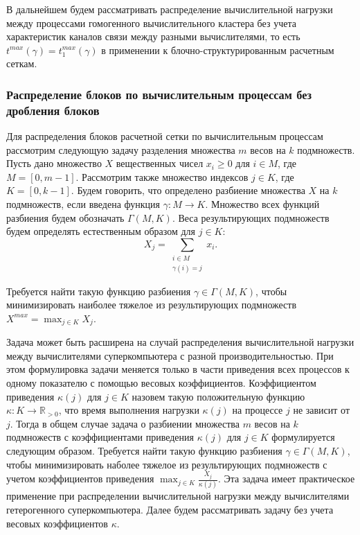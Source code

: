 В дальнейшем будем рассматривать распределение вычислительной нагрузки между процессами гомогенного вычислительного кластера без учета характеристик каналов связи между разными вычислителями, то есть $t^{max}(\gamma) = t_1^{max}(\gamma)$ в применении к блочно-структурированным расчетным сеткам.

\subsubsection{Распределение блоков по вычислительным процессам без дробления блоков}

Для распределения блоков расчетной сетки по вычислительным процессам рассмотрим следующую задачу разделения множества $m$ весов на $k$ подмножеств.
Пусть дано множество $X$ вещественных чисел $x_i \ge 0$ для $i \in M$, где $M = [0, m - 1]$.
Рассмотрим также множество индексов $j \in K$, где $K = [0, k - 1]$.
Будем говорить, что определено разбиение множества $X$ на $k$ подмножеств, если введена функция $\gamma: M \rightarrow K$.
Множество всех функций разбиения будем обозначать $\Gamma(M, K)$.
Веса результирующих подмножеств будем определять естественным образом для $j \in K$:
\begin{equation}
	X_j = \sum_{\substack{i \in M \\ \gamma(i) = j}}{x_i}.
\end{equation}

Требуется найти такую функцию разбиения $\gamma \in \Gamma(M, K)$, чтобы минимизировать наиболее тяжелое из результирующих подмножеств $X^{max} = \max_{j \in K}{X_j}$.

Задача может быть расширена на случай распределения вычислительной нагрузки между вычислителями суперкомпьютера с разной производительностью.
При этом формулировка задачи меняется только в части приведения всех процессов к одному показателю с помощью весовых коэффициентов.
Коэффициентом приведения $\kappa(j)$ для $j \in K$ назовем такую положительную функцию $\kappa: K \rightarrow \mathbb{R}_{>0}$, что время выполнения нагрузки $\kappa(j)$ на процессе $j$ не зависит от $j$.
Тогда в общем случае задача о разбиении множества $m$ весов на $k$ подмножеств с коэффициентами приведения $\kappa(j)$ для $j \in K$ формулируется следующим образом.
Требуется найти такую функцию разбиения $\gamma \in \Gamma(M, K)$, чтобы минимизировать наболее тяжелое из результирующих подмножеств с учетом коэффициентов приведения $\max_{j \in K}{ \frac{X_j}{\kappa(j)} }$.
Эта задача имеет практическое применение при распределении вычислительной нагрузки между вычислителями гетерогенного суперкомпьютера.
Далее будем рассматривать задачу без учета весовых коэффициентов $\kappa$.

